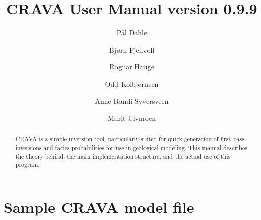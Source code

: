 \documentclass[screen,note,long,backref,indentpar]{nrdoc}
\title{CRAVA User Manual version 0.9.9}
\author{P{\aa}l Dahle\and Bj{\o}rn Fjellvoll\and Ragnar Hauge\and Odd Kolbj{\o}rnsen\and Anne Randi Syversveen\and Marit Ulvmoen}
\newcommand{\crava} {\textsf{CRAVA}\xspace}
\begin{document}
\maketitle

\begin{abstract}
CRAVA is a simple inversion tool, particularly suited for quick generation of first pass inversions and facies probabilities for use in geological modeling. This manual describes the theory behind, the main implementation structure, and the actual use of this program.
\end{abstract}

\tableofcontents
\clearemptydoublepage



\newpage

\newpage

\newpage



\appendix


\chapter{Sample \crava model file}
\label{sec:crava-model-file}

\vspace{-2em}
\end{document}
